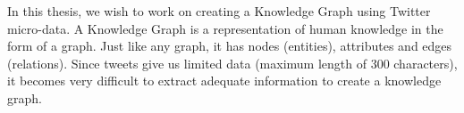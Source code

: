 
In this thesis, we wish to work on creating a Knowledge Graph using Twitter micro-data.
A Knowledge Graph is a representation of human knowledge in the form of a graph. Just like any graph, 
it has nodes (entities), attributes and edges (relations). Since tweets give us limited data 
(maximum length of 300 characters), it becomes very difficult to extract adequate information to create 
a knowledge graph.





\endinput